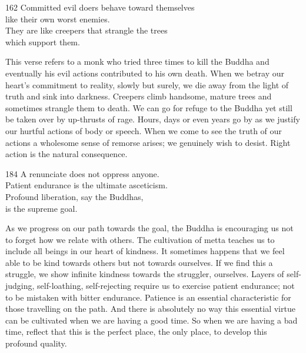 \begin{dhpVerse}{162}
\label{dhp-162}
Committed evil doers behave toward themselves\\
like their own worst enemies.\\
They are like creepers that strangle the trees\\
which support them.
\end{dhpVerse}

\begin{dhpRefl}

This verse refers to a monk who tried three times to kill the Buddha
and eventually his evil actions contributed to his own death. When we
betray our heart's commitment to reality, slowly but surely, we die
away from the light of truth and sink into darkness. Creepers climb
handsome, mature trees and sometimes strangle them to death. We can
go for refuge to the Buddha yet still be taken over by up-thrusts of
rage. Hours, days or even years go by as we justify our hurtful
actions of body or speech. When we come to see the truth of our
actions a wholesome sense of remorse arises; we genuinely wish to
desist. Right action is the natural consequence.

\end{dhpRefl}


\begin{dhpVerse}{184}
\label{dhp-184}
A renunciate does not oppress anyone.\\
Patient endurance is the ultimate asceticism.\\
Profound liberation, say the Buddhas,\\
is the supreme goal.
\end{dhpVerse}

\begin{dhpRefl}

As we progress on our path towards the goal, the Buddha is
encouraging us not to forget how we relate with others. The
cultivation of metta teaches us to include all beings in our heart of
kindness. It sometimes happens that we feel able to be kind towards
others but not towards ourselves. If we find this a struggle, we show
infinite kindness towards the struggler, ourselves. Layers of
self-judging, self-loathing, self-rejecting require us to exercise
patient endurance; not to be mistaken with bitter endurance. Patience
is an essential characteristic for those travelling on the path. And
there is absolutely no way this essential virtue can be cultivated
when we are having a good time. So when we are having a bad time,
reflect that this is the perfect place, the only place, to develop
this profound quality.

\end{dhpRefl}

